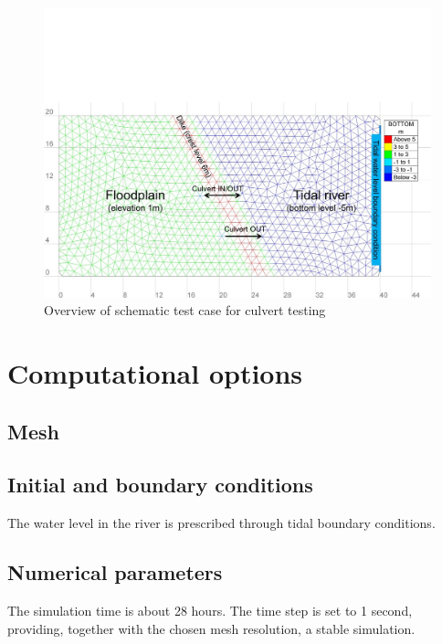 \begin{figure}[h]
\begin{center}
	\includegraphics[scale=0.5]{img/figure1.png}
\end{center}
\caption{Overview of schematic test case for culvert testing}
\label{fig:culvert_figure1}
\end{figure}

\section{Computational options}
%
\subsection{Mesh}

\subsection{Initial and boundary conditions}
The water level in the river is prescribed through tidal boundary conditions.
%
\subsection{Numerical parameters}


The simulation time is about 28 hours.
The time step is set to 1 second, providing, together with the chosen mesh resolution, a stable simulation.

